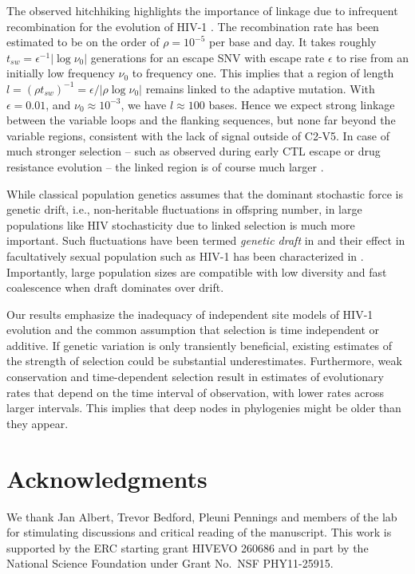 \documentclass[11pt]{article}
\newcommand{\shankaregion}{C2-V5}
\begin{document}
The observed hitchhiking highlights the importance of linkage due to
infrequent recombination for the evolution of HIV-1
\citep{neher_recombination_2010, batorsky_estimate_2011,
josefsson_majority_2011}. The recombination rate has been estimated to be on the
order of $\rho = 10^{-5}$ per base and day. It takes roughly $t_{sw} =
\epsilon^{-1} |\log \nu_0|$ generations for an escape SNV with escape rate
$\epsilon$ to rise from an initially low frequency $\nu_0$ to frequency
one. This implies that a region of length $l = (\rho t_{sw})^{-1} = \epsilon /
|\rho \log \nu_0|$ remains linked to the adaptive mutation. With
$\epsilon=0.01$, and $\nu_0\approx 10^{-3}$, 
we have $l\approx 100$ bases. Hence we expect strong linkage between the
variable loops and the flanking sequences, but none far beyond the variable
regions, consistent with the lack of signal outside of \shankaregion. In case of
much stronger selection -- such as observed during early CTL escape or drug
resistance evolution -- the linked region is of course much larger
\citep{nijhuis_stochastic_1998}. 

While classical population genetics assumes that the dominant stochastic force
is genetic drift, i.e., non-heritable fluctuations in offspring number,
in large populations like HIV stochasticity due to linked selection is much more important.
Such fluctuations have been termed \emph{genetic draft} in
\citet{gillespie_genetic_2000} and their effect in facultatively sexual population
such as HIV-1 has been characterized in \citep{neher_genetic_2011}. Importantly,
large population sizes are compatible with low diversity and fast coalescence
when draft dominates over drift.

Our results emphasize the inadequacy of independent site models of HIV-1 evolution
and the common assumption that selection is time independent or additive. 
If genetic variation is only transiently beneficial, existing estimates of the
strength of selection \citep{neher_recombination_2010,batorsky_estimate_2011}
could be substantial underestimates. Furthermore, weak conservation and
time-dependent selection result in estimates of evolutionary 
rates that depend on the time interval of observation, with lower rates across
larger intervals. This implies that deep nodes in phylogenies might be older than 
they appear.


\section*{Acknowledgments}
We thank Jan Albert, Trevor Bedford, Pleuni Pennings and members of the lab for 
stimulating discussions and critical reading of the manuscript.
This work is supported by the ERC starting grant HIVEVO 260686 and 
in part by the National Science Foundation under Grant No.~NSF PHY11-25915.
\end{document}
